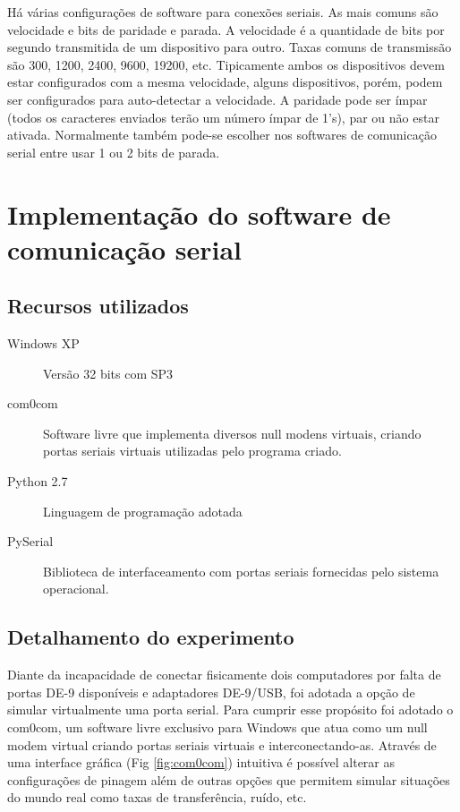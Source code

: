 \documentclass[brazil,times,12pt]{abnt}
\begin{document}
	Há várias configurações de software para conexões seriais. As mais comuns são
	velocidade e bits de paridade e parada. A velocidade é a quantidade de bits
	por segundo transmitida de um dispositivo para outro. Taxas comuns de
	transmissão são 300, 1200, 2400, 9600, 19200, etc. Tipicamente ambos os
	dispositivos devem estar configurados com a mesma velocidade, alguns
	dispositivos, porém, podem ser configurados para auto-detectar a velocidade. A
	paridade pode ser ímpar (todos os caracteres enviados terão um número ímpar de
	1's), par ou não estar ativada. Normalmente também pode-se escolher nos
	softwares de comunicação serial entre usar 1 ou 2 bits de parada. \cite{wiki:rs232}
	
\section*{Implementação do software de comunicação serial}
	\subsection*{Recursos utilizados}
	\begin{description}
	  \item[Windows XP] Versão 32 bits com SP3
	  \item[com0com] Software livre que implementa diversos null modens virtuais,
	  criando portas seriais virtuais utilizadas pelo programa criado.
	  \item[Python 2.7] Linguagem de programação adotada
	  \item[PySerial] Biblioteca de interfaceamento com portas seriais fornecidas
	  pelo sistema operacional.
	\end{description}

	\subsection*{Detalhamento do experimento}
	Diante da incapacidade de conectar fisicamente dois computadores por falta de
	portas DE-9 disponíveis e adaptadores DE-9/USB, foi adotada a opção de simular
	virtualmente uma porta serial. Para cumprir esse propósito foi adotado o
	com0com, um software livre exclusivo para Windows que atua como um null modem
	virtual criando portas seriais virtuais e interconectando-as. Através de uma
	interface gráfica (Fig \ref{fig:com0com}) intuitiva é possível alterar as configurações
	de pinagem além de outras opções que permitem simular situações do mundo real como taxas de
	transferência, ruído, etc.
	
\end{document}
